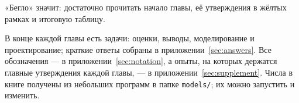 «Бегло» значит: достаточно прочитать начало главы, её утверждения в жёлтых рамках и итоговую таблицу.

В конце каждой главы есть задачи: оценки, выводы, моделирование и проектирование; краткие ответы собраны в приложении~\ref{sec:answers}. Все обозначения --- в приложении~\ref{sec:notation}, а опыты, на которых держатся главные утверждения каждой главы, --- в приложении~\ref{sec:supplement}. Числа в книге получены из небольших программ в папке \texttt{models/}; их можно запустить и изменить.
